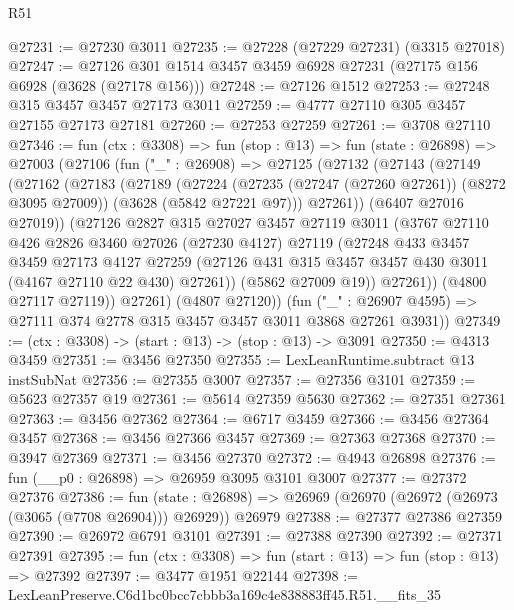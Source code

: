 \begin{lexlean}{R51}
\begin{coremodule}
@27231 := @27230 @3011
@27235 := @27228 (@27229 @27231) (@3315 @27018)
@27247 := @27126 @301 @1514 @3457 @3459 @6928 @27231 (@27175 @156 @6928 (@3628 (@27178 @156)))
@27248 := @27126 @1512
@27253 := @27248 @315 @3457 @3457 @27173 @3011
@27259 := @4777 @27110 @305 @3457 @27155 @27173 @27181
@27260 := @27253 @27259
@27261 := @3708 @27110
@27346 := fun (ctx : @3308) =>
  fun (stop : @13) =>
  fun (state : @26898) =>
  @27003
    (@27106
      (fun ("_" : @26908) =>
      @27125
        (@27132
          (@27143
            (@27149
              (@27162
                (@27183
                  (@27189
                    (@27224
                      (@27235 (@27247 (@27260 @27261)) (@8272 @3095 @27009))
                      (@3628 (@5842 @27221 @97)))
                    @27261))
                (@6407 @27016 @27019))
              (@27126
                @2827
                @315
                @27027
                @3457
                @27119
                @3011
                (@3767
                  @27110
                  @426
                  @2826
                  @3460
                  @27026
                  (@27230 @4127)
                  @27119
                  (@27248
                    @433
                    @3457
                    @3459
                    @27173
                    @4127
                    @27259
                    (@27126 @431 @315 @3457 @3457 @430 @3011 (@4167 @27110 @22 @430) @27261))
                  (@5862 @27009 @19))
                @27261))
            (@4800 @27117 @27119))
          @27261)
        (@4807 @27120))
      (fun ("_" : @26907 @4595) => @27111 @374 @2778 @315 @3457 @3457 @3011 @3868 @27261 @3931))
@27349 := (ctx : @3308) -> (start : @13) -> (stop : @13) -> @3091
@27350 := @4313 @3459
@27351 := @3456 @27350
@27355 := LexLeanRuntime.subtract @13 instSubNat
@27356 := @27355 @3007
@27357 := @27356 @3101
@27359 := @5623 @27357 @19
@27361 := @5614 @27359 @5630
@27362 := @27351 @27361
@27363 := @3456 @27362
@27364 := @6717 @3459
@27366 := @3456 @27364 @3457
@27368 := @3456 @27366 @3457
@27369 := @27363 @27368
@27370 := @3947 @27369
@27371 := @3456 @27370
@27372 := @4943 @26898
@27376 := fun (__p0 : @26898) => @26959 @3095 @3101 @3007
@27377 := @27372 @27376
@27386 := fun (state : @26898) =>
  @26969 (@26970 (@26972 (@26973 (@3065 (@7708 @26904))) @26929)) @26979
@27388 := @27377 @27386 @27359
@27390 := @26972 @6791 @3101
@27391 := @27388 @27390
@27392 := @27371 @27391
@27395 := fun (ctx : @3308) => fun (start : @13) => fun (stop : @13) => @27392
@27397 := @3477 @1951 @22144
@27398 := LexLeanPreserve.C6d1bc0bcc7cbbb3a169c4e838883ff45.R51.__fits_35

\end{coremodule}
\end{lexlean}
